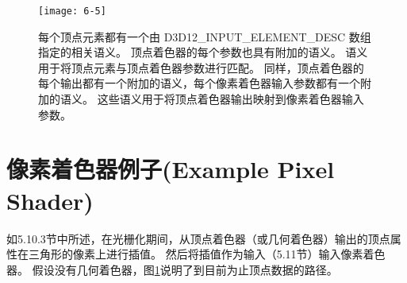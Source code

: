 \begin{figure}[h]
	\texttt{[image: 6-5]}
	\centering
	\caption{每个顶点元素都有一个由 D3D12\_INPUT\_ELEMENT\_DESC 数组指定的相关语义。 顶点着色器的每个参数也具有附加的语义。 语义用于将顶点元素与顶点着色器参数进行匹配。 同样，顶点着色器的每个输出都有一个附加的语义，每个像素着色器输入参数都有一个附加的语义。 这些语义用于将顶点着色器输出映射到像素着色器输入参数。}
	\label{fig:6-5}
\end{figure}

\section{像素着色器例子(Example Pixel Shader)}
\begin{flushleft}
如5.10.3节中所述，在光栅化期间，从顶点着色器（或几何着色器）输出的顶点属性在三角形的像素上进行插值。 然后将插值作为输入（5.11节）输入像素着色器。 假设没有几何着色器，图\ref{fig:6-5}说明了到目前为止顶点数据的路径。
\end{flushleft}

